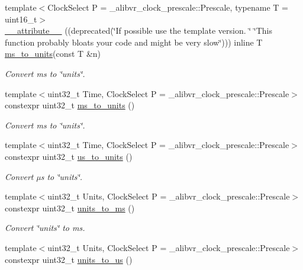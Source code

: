 \begin{DoxyCompactItemize}
{\footnotesize template$<$Clock\+Select P = \+\_\+alibvr\+\_\+clock\+\_\+prescale\+::\+Prescale, typename T  = uint16\+\_\+t$>$ }\\\hyperlink{namespaceclock_ad835387e001884a66a0c3538ab172505}{\+\_\+\+\_\+attribute\+\_\+\+\_\+} ((deprecated(\char`\"{}If possible use the template version.  \char`\"{} \char`\"{}This function probably bloats your code and might be very slow\char`\"{}))) inline T \hyperlink{namespaceclock_ae159a2e83f7b30eeafe3d5be8a3f5ef6}{ms\+\_\+to\+\_\+units}(const T \&n)
\begin{DoxyCompactList}\small\item\em Convert ms to \char`\"{}units\char`\"{}. \end{DoxyCompactList}\item 
{\footnotesize template$<$uint32\+\_\+t Time, Clock\+Select P = \+\_\+alibvr\+\_\+clock\+\_\+prescale\+::\+Prescale$>$ }\\constexpr uint32\+\_\+t \hyperlink{namespaceclock_ae159a2e83f7b30eeafe3d5be8a3f5ef6}{ms\+\_\+to\+\_\+units} ()
\begin{DoxyCompactList}\small\item\em Convert ms to \char`\"{}units\char`\"{}. \end{DoxyCompactList}\item 
{\footnotesize template$<$uint32\+\_\+t Time, Clock\+Select P = \+\_\+alibvr\+\_\+clock\+\_\+prescale\+::\+Prescale$>$ }\\constexpr uint32\+\_\+t \hyperlink{namespaceclock_a058555acfdfbc406daf1cb9331b0bc6f}{us\+\_\+to\+\_\+units} ()
\begin{DoxyCompactList}\small\item\em Convert µs to \char`\"{}units\char`\"{}. \end{DoxyCompactList}\item 
{\footnotesize template$<$uint32\+\_\+t Units, Clock\+Select P = \+\_\+alibvr\+\_\+clock\+\_\+prescale\+::\+Prescale$>$ }\\constexpr uint32\+\_\+t \hyperlink{namespaceclock_a475b3551d89e7a345492a61f70830bd8}{units\+\_\+to\+\_\+ms} ()
\begin{DoxyCompactList}\small\item\em Convert \char`\"{}units\char`\"{} to ms. \end{DoxyCompactList}\item 
{\footnotesize template$<$uint32\+\_\+t Units, Clock\+Select P = \+\_\+alibvr\+\_\+clock\+\_\+prescale\+::\+Prescale$>$ }\\constexpr uint32\+\_\+t \hyperlink{namespaceclock_a320b3614df868e901b2f022f70a3d8ae}{units\+\_\+to\+\_\+us} ()

\end{DoxyCompactItemize}
